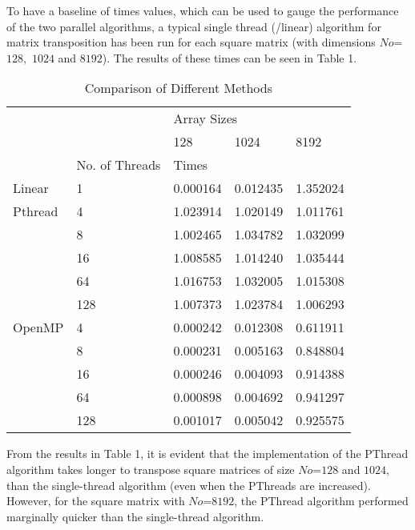 \documentclass[journal, a4paper]{IEEEtran}
\begin{document}
To have a baseline of times values, which can be used to gauge the performance of the two parallel algorithms, a typical single thread (/linear) algorithm for matrix transposition has been run for each square matrix (with dimensions $No$= $128,$ $1024$ and $8192$). The results of these times can be seen in Table 1. \\

\begin{table}[H]
\centering
\caption{Comparison of Different Methods}
\label{my-label}
\begin{tabular}{|l|l|l|l|l|}
\hline
\multicolumn{2}{|l|}{\multirow{2}{*}{}} & \multicolumn{3}{l|}{Array Sizes} \\ \cline{3-5} 
\multicolumn{2}{|l|}{}                  & 128      & 1024      & 8192      \\ \hline
                     & No. of Threads   & \multicolumn{3}{l|}{Times}       \\ \hline
Linear               & 1                &     0.000164     &       0.012435    &       1.352024    \\ \hline
Pthread              & 4                &    1.023914      &      1.020149     &    1.011761      \\ \hline
\multirow{4}{*}{}    & 8                &   1.002465     &    1.034782       &  1.032099         \\ \cline{2-5} 
                     & 16               &   1.008585      &      1.014240     &    1.035444       \\ \cline{2-5} 
                     & 64               &    1.016753     &    1.032005       &     1.015308      \\ \cline{2-5} 
                     & 128              &   1.007373       &   1.023784        &   1.006293         \\ \hline
OpenMP               & 4                &  0.000242        &      0.012308     &     0.611911      \\ \hline
\multirow{4}{*}{}    & 8                &   0.000231       &    0.005163       &   0.848804        \\ \cline{2-5} 
                     & 16               &  0.000246          &    0.004093       &    0.914388       \\ \cline{2-5} 
                     & 64               &     0.000898     &     0.004692      &     0.941297      \\ \cline{2-5} 
                     & 128              &   0.001017       &    0.005042       &     0.925575      \\ \hline
\end{tabular}
\end{table}
From the results in Table 1, it is evident that the implementation of the PThread algorithm takes longer to transpose square matrices of size $No$=$128$ and $1024$, than the single-thread algorithm (even when the PThreads are increased). However, for the square matrix with $No$=$8192$, the PThread algorithm performed marginally quicker than the single-thread algorithm.\\
\end{document}

